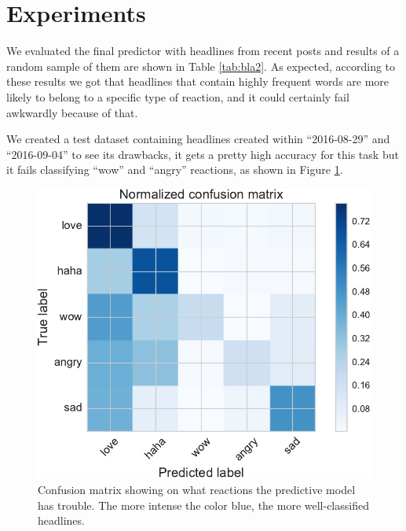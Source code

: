 \documentclass[11pt]{article}
\begin{document}
\section{Experiments}

We evaluated the final predictor with headlines from recent posts and results of a random sample of them are shown in Table \ref{tab:bla2}. As expected, according to these results we got that headlines that contain highly frequent words are more likely to belong to a specific type of reaction, and it could certainly fail awkwardly because of that.

We created a test dataset containing headlines created within ``2016-08-29'' and ``2016-09-04'' to see its drawbacks, it gets a pretty high accuracy for this task but it fails classifying ``wow'' and ``angry'' reactions, as shown in Figure \ref{fig:conf}.

\begin{figure}[ht!]
\centering
\includegraphics[width=0.9\columnwidth]{../3_notebooks/notebook_figures/conf.pdf}
\caption{Confusion matrix showing on what reactions the predictive model has trouble. The more intense the color blue, the more well-classified headlines.}
\label{fig:conf}
\end{figure}
\end{document}

